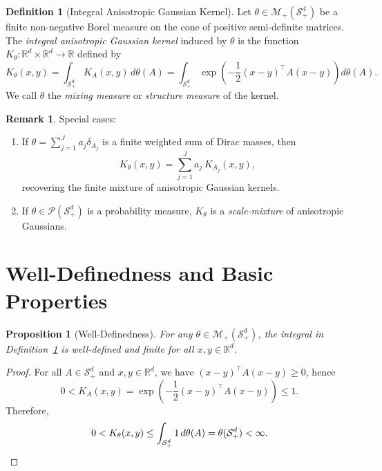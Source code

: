 \documentclass[11pt]{article}
\newtheorem{proposition}[theorem]{Proposition}
\theoremstyle{definition}
\newtheorem{definition}[theorem]{Definition}
\newtheorem{remark}[theorem]{Remark}
\newcommand{\R}{\mathbb{R}}
\newcommand{\Splus}{\mathcal{S}_+^d}
\newcommand{\M}{\mathcal{M}}
\begin{document}
\begin{definition}[Integral Anisotropic Gaussian Kernel]
\label{def:integral-kernel}
Let $\theta \in \M_+(\Splus)$ be a finite non-negative Borel measure on the cone of positive semi-definite matrices. The \emph{integral anisotropic Gaussian kernel} induced by $\theta$ is the function $K_\theta: \R^d \times \R^d \to \R$ defined by
\begin{equation}
    \boxed{
    K_\theta(x, y) = \int_{\Splus} K_A(x, y) \, d\theta(A) = \int_{\Splus} \exp\left( -\frac{1}{2}(x-y)^\top A (x-y) \right) d\theta(A).
    }
\end{equation}
We call $\theta$ the \emph{mixing measure} or \emph{structure measure} of the kernel.
\end{definition}

\begin{remark}
Special cases:
\begin{enumerate}[label=(\roman*)]
    \item If $\theta = \sum_{j=1}^J a_j \delta_{A_j}$ is a finite weighted sum of Dirac masses, then
    \begin{equation}
        K_\theta(x,y) = \sum_{j=1}^J a_j \, K_{A_j}(x,y),
    \end{equation}
    recovering the finite mixture of anisotropic Gaussian kernels.
    \item If $\theta \in \mathcal{P}(\Splus)$ is a probability measure, $K_\theta$ is a \emph{scale-mixture} of anisotropic Gaussians.
\end{enumerate}
\end{remark}

\section{Well-Definedness and Basic Properties}

\begin{proposition}[Well-Definedness]
\label{prop:well-defined}
For any $\theta \in \M_+(\Splus)$, the integral in Definition~\ref{def:integral-kernel} is well-defined and finite for all $x, y \in \R^d$.
\end{proposition}

\begin{proof}
For all $A \in \Splus$ and $x, y \in \R^d$, we have $(x-y)^\top A (x-y) \geq 0$, hence
\begin{equation}
    0 < K_A(x,y) = \exp\left(-\frac{1}{2}(x-y)^\top A (x-y)\right) \leq 1.
\end{equation}
Therefore,
\begin{equation}
    0 < K_\theta(x,y) \leq \int_{\Splus} 1 \, d\theta(A) = \theta(\Splus) < \infty. \qedhere
\end{equation}
\end{proof}
\end{document}
